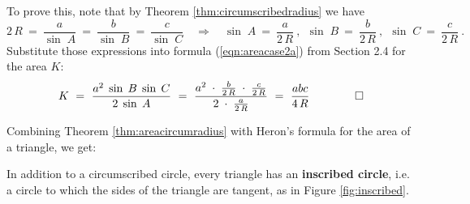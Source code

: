 
To prove this, note that by Theorem \ref{thm:circumscribedradius} we have
\begin{displaymath}
 2\,R ~=~ \frac{a}{\sin\;A} ~=~ \frac{b}{\sin\;B} ~=~ \frac{c}{\sin\;C} \quad\Rightarrow\quad
  \sin\;A ~=~ \frac{a}{2\,R} ~,~~ \sin\;B ~=~ \frac{b}{2\,R} ~,~~ \sin\;C ~=~ \frac{c}{2\,R} ~.
\end{displaymath}
Substitute those expressions into formula (\ref{eqn:areacase2a}) from Section 2.4 for the area $K$:
\begin{displaymath}
 K ~=~ \frac{a^2 \;\sin\;B \;\sin\;C}{2\;\sin\;A} ~=~
  \frac{a^2 \;\cdot\; \frac{b}{2\,R} \;\cdot\; \frac{c}{2\,R}}{2\;\cdot\; \frac{a}{2\,R}}
  ~=~ \frac{abc}{4\,R}  \qquad\qed
\end{displaymath}

\noindent Combining Theorem \ref{thm:areacircumradius} with Heron's formula for the area of a
triangle, we get:


In addition to a circumscribed circle, every triangle has an \textbf{inscribed circle}, i.e. a
circle to which the sides of the triangle are
tangent, as in Figure \ref{fig:inscribed}.

